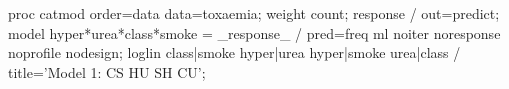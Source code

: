 \begin{listing}
proc catmod order=data data=toxaemia;
   weight count;
   response  / out=predict;
   model hyper*urea*class*smoke =  _response_ / pred=freq
      ml noiter noresponse noprofile nodesign;
   loglin  class|smoke hyper|urea hyper|smoke urea|class /
       title='Model 1: CS  HU  SH  CU';
\end{listing}
